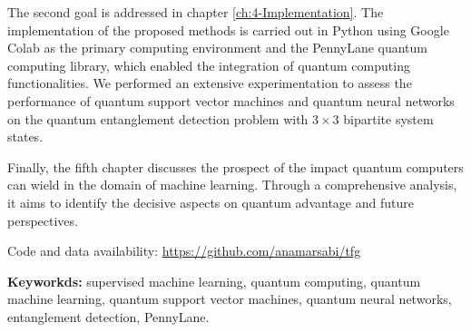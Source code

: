 The second goal is addressed in chapter \ref{ch:4-Implementation}. The implementation of the proposed methods is carried out in Python using Google Colab as the primary computing environment and the PennyLane quantum computing library,  which enabled the integration of quantum computing functionalities. We performed an extensive experimentation to assess the performance of quantum support vector machines and quantum neural networks on the quantum entanglement detection problem  with $3 \times 3$ bipartite system states.
\vspace{5pt}

Finally, the fifth chapter discusses the prospect of the impact quantum computers can wield in the domain of machine learning. Through a comprehensive analysis, it aims to identify the decisive aspects on quantum advantage and future perspectives.
\vspace{5pt} 

Code and data availability: \url{https://github.com/anamarsabi/tfg}

\vspace{5pt}

\textbf{Keyworkds:} supervised machine learning, quantum computing, quantum machine learning, quantum support vector machines, quantum neural networks, entanglement detection, PennyLane.
\endinput
